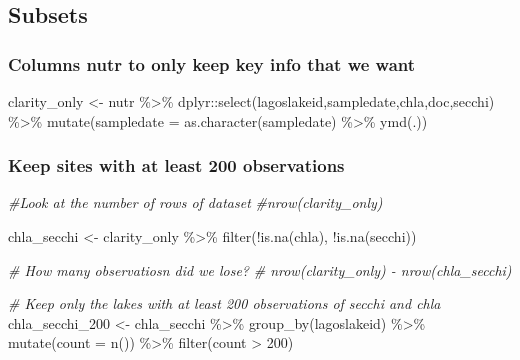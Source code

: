 \documentclass[
]{book}
\newenvironment{Shaded}{\begin{snugshade}}{\end{snugshade}}
\newcommand{\AttributeTok}[1]{\textcolor[rgb]{0.77,0.63,0.00}{#1}}
\newcommand{\CommentTok}[1]{\textcolor[rgb]{0.56,0.35,0.01}{\textit{#1}}}
\newcommand{\DecValTok}[1]{\textcolor[rgb]{0.00,0.00,0.81}{#1}}
\newcommand{\FunctionTok}[1]{\textcolor[rgb]{0.00,0.00,0.00}{#1}}
\newcommand{\NormalTok}[1]{#1}
\newcommand{\OtherTok}[1]{\textcolor[rgb]{0.56,0.35,0.01}{#1}}
\newcommand{\SpecialCharTok}[1]{\textcolor[rgb]{0.00,0.00,0.00}{#1}}
\begin{document}
\hypertarget{subsets}{%
\subsection{Subsets}\label{subsets}}

\hypertarget{columns-nutr-to-only-keep-key-info-that-we-want}{%
\subsubsection{Columns nutr to only keep key info that we want}\label{columns-nutr-to-only-keep-key-info-that-we-want}}

\begin{Shaded}
\begin{Highlighting}[]
\NormalTok{clarity\_only }\OtherTok{\textless{}{-}}\NormalTok{ nutr }\SpecialCharTok{\%\textgreater{}\%}
\NormalTok{  dplyr}\SpecialCharTok{::}\FunctionTok{select}\NormalTok{(lagoslakeid,sampledate,chla,doc,secchi) }\SpecialCharTok{\%\textgreater{}\%}
  \FunctionTok{mutate}\NormalTok{(}\AttributeTok{sampledate =} \FunctionTok{as.character}\NormalTok{(sampledate) }\SpecialCharTok{\%\textgreater{}\%} \FunctionTok{ymd}\NormalTok{(.))}
\end{Highlighting}
\end{Shaded}

\hypertarget{keep-sites-with-at-least-200-observations}{%
\subsubsection{Keep sites with at least 200 observations}\label{keep-sites-with-at-least-200-observations}}

\begin{Shaded}
\begin{Highlighting}[]
\CommentTok{\#Look at the number of rows of dataset}
\CommentTok{\#nrow(clarity\_only)}

\NormalTok{chla\_secchi }\OtherTok{\textless{}{-}}\NormalTok{ clarity\_only }\SpecialCharTok{\%\textgreater{}\%}
  \FunctionTok{filter}\NormalTok{(}\SpecialCharTok{!}\FunctionTok{is.na}\NormalTok{(chla),}
         \SpecialCharTok{!}\FunctionTok{is.na}\NormalTok{(secchi))}

\CommentTok{\# How many observatiosn did we lose?}
\CommentTok{\# nrow(clarity\_only) {-} nrow(chla\_secchi)}


\CommentTok{\# Keep only the lakes with at least 200 observations of secchi and chla}
\NormalTok{chla\_secchi\_200 }\OtherTok{\textless{}{-}}\NormalTok{ chla\_secchi }\SpecialCharTok{\%\textgreater{}\%}
  \FunctionTok{group\_by}\NormalTok{(lagoslakeid) }\SpecialCharTok{\%\textgreater{}\%}
  \FunctionTok{mutate}\NormalTok{(}\AttributeTok{count =} \FunctionTok{n}\NormalTok{()) }\SpecialCharTok{\%\textgreater{}\%}
  \FunctionTok{filter}\NormalTok{(count }\SpecialCharTok{\textgreater{}} \DecValTok{200}\NormalTok{)}
\end{Highlighting}
\end{Shaded}
\end{document}
